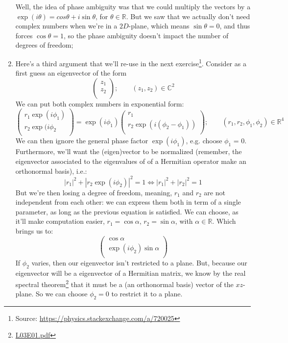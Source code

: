 \documentclass[solutions.tex]{subfiles}
\begin{document}
\begin{enumerate}
	Well, the idea of phase ambiguity was that we could multiply
	the vectors by a $\exp(i\theta) = cos\theta+i\sin\theta$, for
	$\theta\in\mathbb{R}$. But we saw that we actually don't need
	complex numbers when we're in a $2D$-plane, which means
	$\sin\theta = 0$, and thus forces $\cos\theta = 1$, so the
	phase ambiguity doesn't impact the number of degrees
	of freedom;

	\item Here's a third argument that we'll re-use in the next
	exercise\footnote{Source: \url{https://physics.stackexchange.com/a/720025}}.
	Consider as a first guess an eigenvector of the form
	\[
		\begin{pmatrix}
			z_1 \\
			z_2 \\
		\end{pmatrix};\qquad (z_1, z_2)\in\mathbb{C}^2
	\]
	We can put both complex numbers in exponential form:
	\[
		\begin{pmatrix}
			r_1\exp(i\phi_1) \\
			r_2\exp(i\phi_2 \\
		\end{pmatrix} = \exp(i\phi_1)\begin{pmatrix}
			r_1 \\
			r_2\exp(i(\phi_2-\phi_1)) \\
		\end{pmatrix};\qquad (r_1, r_2, \phi_1, \phi_2)\in\mathbb{R}^4
	\]
	We can then ignore the general phase factor $\exp(i\phi_1)$, e.g.
	choose $\phi_1$ = 0. Furthermore, we'll want the (eigen)vector to be
	normalized (remember, the eigenvector associated to the eigenvalues
	of of a Hermitian operator make an orthonormal basis), i.e.:
	\[
		|r_1|^2 + |r_2\exp(i\phi_2)|^2 = 1
		\Leftrightarrow |r_1|^2 + |r_2|^2 = 1
	\]
	But we're then losing a degree of freedom, meaning, $r_1$ and $r_2$
	are not independent from each other: we can express them both in term of
	a single parameter, as long as the previous equation is satisfied.
	We can choose, as it'll make computation easier,
	$r_1 = \cos\alpha$, $r_2=\sin\alpha$, with $\alpha\in\mathbb{R}$.
	Which brings us to:
	\[
		\begin{pmatrix}
			\cos\alpha \\
			\exp(i\phi_2)\sin\alpha \\
		\end{pmatrix}
	\]
	If $\phi_2$ varies, then our eigenvector isn't restricted to
	a plane. But, because our eigenvector will be a eigenvector
	of a Hermitian matrix, we know by the real spectral theorem\footnote{
	\href{https://github.com/mbivert/ttm/blob/master/qm/L03E01.pdf}{L03E01.pdf}}
	that it must be a (an orthonormal basis) vector of the $xz$-plane.
	So we can choose $\phi_2 = 0$ to restrict it to a plane.
\end{enumerate}
\end{document}
